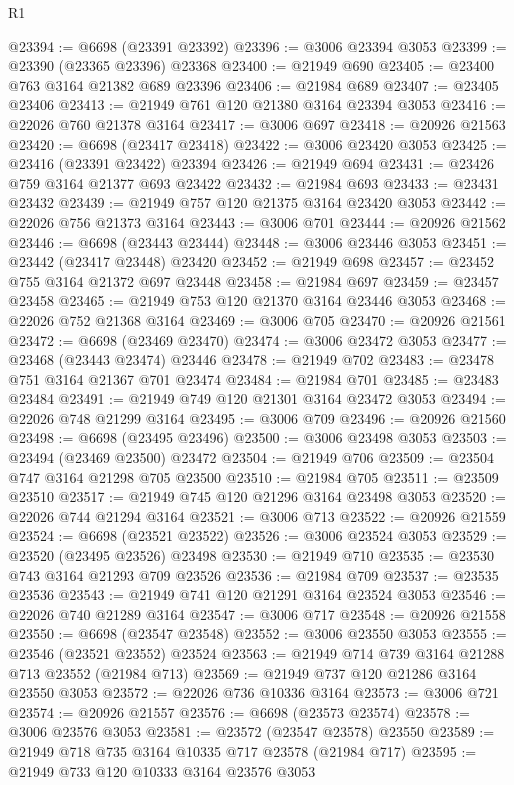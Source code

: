 \begin{lexlean}{R1}
\begin{coremodule}
@23394 := @6698 (@23391 @23392)
@23396 := @3006 @23394 @3053
@23399 := @23390 (@23365 @23396) @23368
@23400 := @21949 @690
@23405 := @23400 @763 @3164 @21382 @689 @23396
@23406 := @21984 @689
@23407 := @23405 @23406
@23413 := @21949 @761 @120 @21380 @3164 @23394 @3053
@23416 := @22026 @760 @21378 @3164
@23417 := @3006 @697
@23418 := @20926 @21563
@23420 := @6698 (@23417 @23418)
@23422 := @3006 @23420 @3053
@23425 := @23416 (@23391 @23422) @23394
@23426 := @21949 @694
@23431 := @23426 @759 @3164 @21377 @693 @23422
@23432 := @21984 @693
@23433 := @23431 @23432
@23439 := @21949 @757 @120 @21375 @3164 @23420 @3053
@23442 := @22026 @756 @21373 @3164
@23443 := @3006 @701
@23444 := @20926 @21562
@23446 := @6698 (@23443 @23444)
@23448 := @3006 @23446 @3053
@23451 := @23442 (@23417 @23448) @23420
@23452 := @21949 @698
@23457 := @23452 @755 @3164 @21372 @697 @23448
@23458 := @21984 @697
@23459 := @23457 @23458
@23465 := @21949 @753 @120 @21370 @3164 @23446 @3053
@23468 := @22026 @752 @21368 @3164
@23469 := @3006 @705
@23470 := @20926 @21561
@23472 := @6698 (@23469 @23470)
@23474 := @3006 @23472 @3053
@23477 := @23468 (@23443 @23474) @23446
@23478 := @21949 @702
@23483 := @23478 @751 @3164 @21367 @701 @23474
@23484 := @21984 @701
@23485 := @23483 @23484
@23491 := @21949 @749 @120 @21301 @3164 @23472 @3053
@23494 := @22026 @748 @21299 @3164
@23495 := @3006 @709
@23496 := @20926 @21560
@23498 := @6698 (@23495 @23496)
@23500 := @3006 @23498 @3053
@23503 := @23494 (@23469 @23500) @23472
@23504 := @21949 @706
@23509 := @23504 @747 @3164 @21298 @705 @23500
@23510 := @21984 @705
@23511 := @23509 @23510
@23517 := @21949 @745 @120 @21296 @3164 @23498 @3053
@23520 := @22026 @744 @21294 @3164
@23521 := @3006 @713
@23522 := @20926 @21559
@23524 := @6698 (@23521 @23522)
@23526 := @3006 @23524 @3053
@23529 := @23520 (@23495 @23526) @23498
@23530 := @21949 @710
@23535 := @23530 @743 @3164 @21293 @709 @23526
@23536 := @21984 @709
@23537 := @23535 @23536
@23543 := @21949 @741 @120 @21291 @3164 @23524 @3053
@23546 := @22026 @740 @21289 @3164
@23547 := @3006 @717
@23548 := @20926 @21558
@23550 := @6698 (@23547 @23548)
@23552 := @3006 @23550 @3053
@23555 := @23546 (@23521 @23552) @23524
@23563 := @21949 @714 @739 @3164 @21288 @713 @23552 (@21984 @713)
@23569 := @21949 @737 @120 @21286 @3164 @23550 @3053
@23572 := @22026 @736 @10336 @3164
@23573 := @3006 @721
@23574 := @20926 @21557
@23576 := @6698 (@23573 @23574)
@23578 := @3006 @23576 @3053
@23581 := @23572 (@23547 @23578) @23550
@23589 := @21949 @718 @735 @3164 @10335 @717 @23578 (@21984 @717)
@23595 := @21949 @733 @120 @10333 @3164 @23576 @3053

\end{coremodule}
\end{lexlean}
